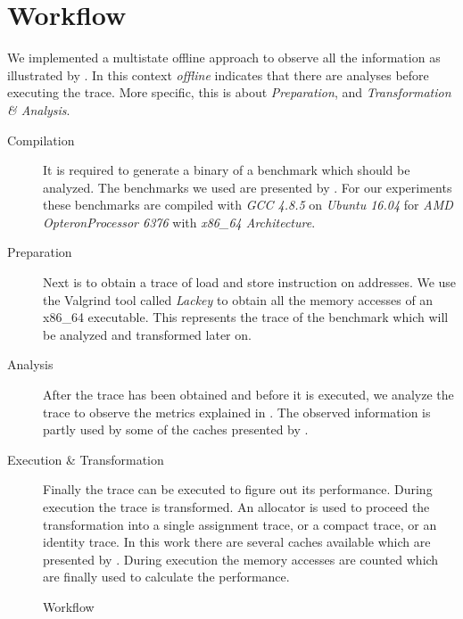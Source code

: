 \documentclass[onecolumn, openright, master, english, signatures]{dbrgrptt}
\begin{document}
\section{Workflow}

We implemented a multistate offline approach to observe all the information as illustrated by .
In this context \emph{offline} indicates that there are analyses before executing the \ac{trace}. More specific, this is about \emph{Preparation}, and \emph{Transformation \& Analysis}.

\begin{description}
  \item[Compilation] It is required to generate a binary of a benchmark which should be analyzed.
  The benchmarks we used are presented by .
  For our experiments these benchmarks are compiled with \emph{GCC 4.8.5} on \emph{Ubuntu 16.04} for \emph{AMD Opteron\texttrademark Processor 6376} with \emph{x86\_64 Architecture}.

  \item[Preparation] Next is to obtain a \ac{trace} of load and store instruction on addresses.
  We use the Valgrind\cite{Valgrind} tool called \emph{Lackey} to obtain all the memory accesses of an x86\_64 executable.
  This represents the \ac{trace} of the benchmark which will be analyzed and transformed later on.

  \item[Analysis] After the \ac{trace} has been obtained and before it is executed, we analyze the \ac{trace} to observe the metrics explained in .
  The observed information is partly used by some of the caches presented by .

  \item[Execution \& Transformation] Finally the \ac{trace} can be executed to figure out its performance.
  During execution the \ac{trace} is transformed.
  An allocator is used to proceed the transformation into a single assignment \ac{trace}, or a compact \ac{trace}, or an identity \ac{trace}.
  In this work there are several caches available which are presented by .
  During execution the memory accesses are counted which are finally used to calculate the performance.
\end{description}

\begin{figure}[!ht]
  \centering
  
  \caption{Workflow}
  \label{fig:workflow}
\end{figure}
\end{document}

